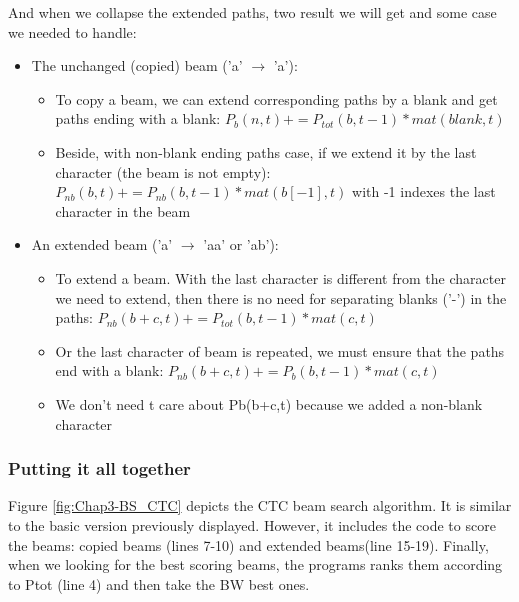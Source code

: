       And when we collapse the extended paths, two result we will get and some case we needed to handle:
        \begin{itemize}
          \item The unchanged (copied) beam ('a' $ \rightarrow $ 'a'):
          \begin{itemize}
            \item To copy a beam, we can extend corresponding paths by a blank and get
            paths ending with a blank: $ P_b (n, t) += P_{tot}(b, t-1)*mat(blank, t) $
            \item Beside, with non-blank ending paths case, if we extend it by the last
            character (the beam is not empty): $ P_{nb}(b,t) += P_{nb}(b,t-1)*mat(b[-1],t) $
            with -1 indexes the last character in the beam
          \end{itemize}
          \item An extended beam ('a' $\rightarrow$ 'aa' or 'ab'):
            \begin{itemize}
              \item To extend a beam. With the last character is different from the character we need
              to extend, then there is no need for separating blanks ('-') in the paths:
                $ P_{nb}(b+c,t) += P_{tot}(b,t-1)*mat(c,t) $
              \item Or the last character of beam is repeated, we must ensure that the paths
              end with a blank: $ P_{nb}(b+c,t) += P_b(b,t-1)*mat(c,t) $
              \item We don't need t care about Pb(b+c,t) because we added a non-blank character
            \end{itemize}
        \end{itemize}

      \subsubsection{ Putting it all together }
        Figure \ref{fig:Chap3-BS_CTC} depicts the CTC beam search algorithm. It is similar to the basic version
        previously displayed. However, it includes the code to score the beams: copied beams
        (lines 7-10) and extended beams(line 15-19). Finally, when we looking for the best scoring
        beams, the programs ranks them according to Ptot (line 4) and then take the BW best ones.

